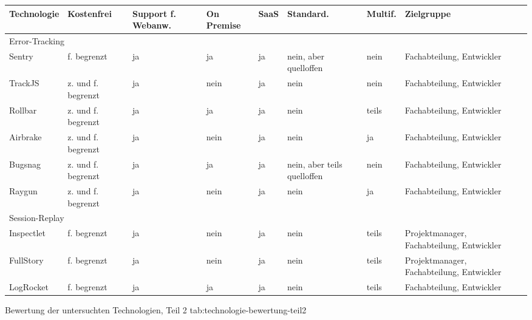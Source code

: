 %
{
\begin{tabular}{|p{2.25cm}|p{2.0cm}|p{2.0cm}|p{2.0cm}|p{1.5cm}|p{2.0cm}|p{1.5cm}|p{2.5cm}|}
\hline
Technologie & Kostenfrei & Support f. Webanw. & On Premise & SaaS & Standard. & Multif. & Zielgruppe \\
\hline
\hline
\multicolumn{7}{|l|}{Error-Tracking} \\
\hline
Sentry & f. begrenzt & ja & ja & ja & nein, aber quelloffen & nein & Fachabteilung, Entwickler \\
\hline
TrackJS & z. und f. begrenzt & ja & nein & ja & nein & nein & Fachabteilung, Entwickler \\
\hline
Rollbar & z. und f. begrenzt & ja & ja & ja & nein & teils & Fachabteilung, Entwickler \\
\hline
Airbrake & z. und f. begrenzt & ja & nein & ja & nein & ja & Fachabteilung, Entwickler \\
\hline
Bugsnag & z. und f. begrenzt & ja & ja & ja & nein, aber teils quelloffen & nein & Fachabteilung, Entwickler \\
\hline
Raygun & z. und f. begrenzt & ja & nein & ja & nein & ja & Fachabteilung, Entwickler \\
\hline
\hline
\multicolumn{7}{|l|}{Session-Replay} \\
\hline
Inspectlet & f. begrenzt & ja & nein & ja & nein & teils & Projektmanager, Fachabteilung, Entwickler \\
\hline
FullStory & f. begrenzt & ja & nein & ja & nein & teils & Projektmanager, Fachabteilung, Entwickler \\
\hline
LogRocket & f. begrenzt & ja & ja & ja & nein & teils & Fachabteilung, Entwickler \\
\hline
\end{tabular}
}
{Bewertung der untersuchten Technologien, Teil 2}
{tab:technologie-bewertung-teil2}